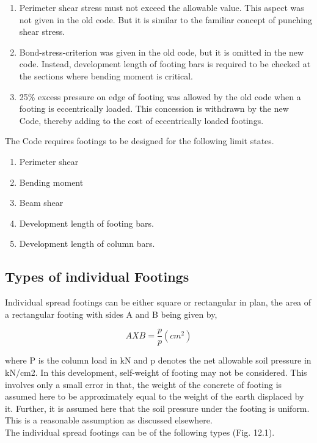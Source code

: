 \documentclass{book}
\begin{document}
\begin{enumerate}
\item Perimeter shear stress must not exceed the allowable value. This aspect was not
given in the old code. But it is similar to the familiar concept of punching shear
stress.

\item Bond-stress-criterion was given in the old code, but it is omitted in the new code.
Instead, development length of footing bars is required to be checked at the sections
where bending moment is critical.

\item 25\% excess pressure on edge of footing was allowed by the old code when a footing
 is eccentrically loaded. This concession is withdrawn by the new Code, thereby
adding to the cost of eccentrically loaded footings.

\end{enumerate}
The Code requires footings to be designed for the following limit states.

\begin{enumerate}
\item Perimeter shear
\item Bending moment
\item Beam shear
\item  Development length of footing bars.
\item Development length of column bars.
\end{enumerate}

\subsection{Types of individual Footings}
Individual spread footings can be either square or rectangular in plan, the area of a rectangular footing with sides A and B being given by,

\begin{equation}
AXB =\frac{p}{p} (cm^2)
\end{equation}

where P is the column load in kN and p denotes the net allowable soil pressure in kN/cm2. In
this development, self-weight of footing may not be considered. This involves only a small error
in that, the weight of the concrete of footing is assumed here to be approximately equal to the
weight of the earth displaced by it. Further, it is assumed here that the soil pressure under
the footing is uniform. This is a reasonable assumption as discussed elsewhere.\\
The individual spread footings can be of the following types (Fig. 12.1).
\newpage
\end{document}
